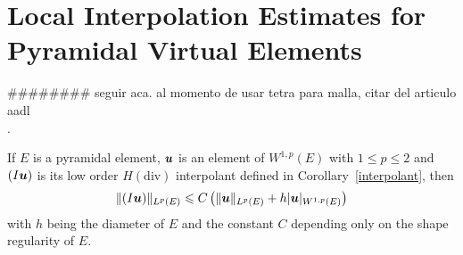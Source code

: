 \section{Local Interpolation Estimates for Pyramidal Virtual Elements}
{\color{blue}\#\#\#\#\#\#\#\# seguir aca. al momento de usar tetra para
malla, citar del articulo aadl\\.}
\begin{theorem}
If $E$ is a pyramidal element, $\boldsymbol{u}$ is an element of $W^{1,p}(E)$ with 
$1\leqslant p\leqslant 2$
and $(I\boldsymbol{u})$ is its low order $H(\text{div})$ interpolant defined in Corollary~\ref{interpolant},
then
\begin{equation}\label{estab2}
\|(I\boldsymbol{u})\|_{L^p(E)}\leqslant C\left(\|\boldsymbol{u}\|_{L^p(E)}+ h|\boldsymbol{u}|_{W^{1,p}(E)}\right)
\end{equation}
with $h$ being the diameter of $E$ and the constant $C$ depending only on the shape regularity of $E$.
\end{theorem}
